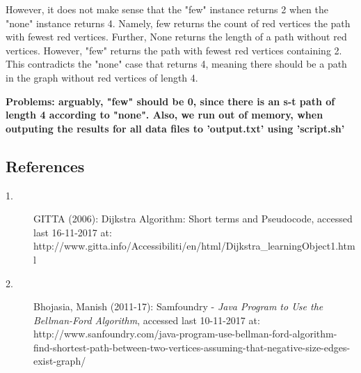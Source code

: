 \documentclass{tufte-handout}
\begin{document}
However, it does not make sense that the "few" instance returns 2 when the "none" instance returns 4. Namely, few returns the count of red vertices the path with fewest red vertices. Further, None returns the length of a path without red vertices. However, "few" returns the path with fewest red vertices containing 2. This contradicts the "none" case that returns 4, meaning there should be a path in the graph without red vertices of length 4. 

\medskip

\textbf{Problems: arguably, "few" should be 0, since there is an s-t path of length 4 according to "none". Also, we run out of memory, when outputing the results for all data files to 'output.txt' using 'script.sh'}




\subsection{References}

\begin{description}
  \item[1.] GITTA (2006): Dijkstra Algorithm: Short terms and Pseudocode, accessed last 16-11-2017 at: http://www.gitta.info/Accessibiliti/en/html/Dijkstra_learningObject1.html
  
  \item[2.] Bhojasia, Manish (2011-17): Samfoundry - \emph{Java Program to Use the Bellman-Ford Algorithm}, accessed last 10-11-2017 at: http://www.sanfoundry.com/java-program-use-bellman-ford-algorithm-find-shortest-path-between-two-vertices-assuming-that-negative-size-edges-exist-graph/
\end{description}
\end{document}
